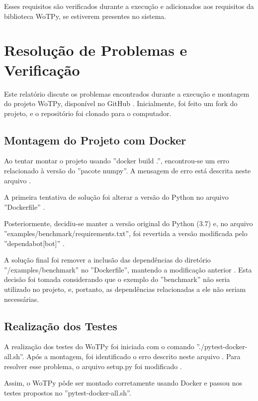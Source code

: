 Esses requisitos são verificados durante a execução e adicionados aos requisitos da biblioteca WoTPy, se estiverem presentes no sistema.

\section{Resolução de Problemas e Verificação}

Este relatório discute os problemas encontrados durante a execução e montagem do projeto WoTPy, disponível no GitHub \cite{gitwotpy:2022}. Inicialmente, foi feito um fork do projeto, e o repositório  foi clonado para o computador.

\subsection{Montagem do Projeto com Docker}

Ao tentar montar o projeto usando ''docker build .'', encontrou-se um erro relacionado à versão do ''pacote numpy''. A mensagem de erro está descrita neste arquivo \cite{gitwotpy:cpd}.

A primeira tentativa de solução foi alterar a versão do Python no arquivo ''Dockerfile'' \cite{gitwotpy:v1}.

Posteriormente, decidiu-se manter a versão original do Python (3.7) e, no arquivo ''examples/benchmark/requirements.txt'', foi revertida a versão modificada pelo ''dependabot[bot]'' \cite{gitwotpy:bot, gitwotpy:v2}.

A solução final foi remover a inclusão das dependências do diretório ''/examples/benchmark'' no ''Dockerfile'', mantendo a modificação anterior \cite{gitwotpy:v5}. Esta decisão foi tomada considerando que o exemplo do ''benchmark'' não seria utilizado no projeto, e, portanto, as dependências relacionadas a ele não seriam necessárias.

\subsection{Realização dos Testes}

A realização dos testes do WoTPy foi iniciada com o comando ''./pytest-docker-all.sh''. Após a montagem, foi identificado o erro descrito neste arquivo . Para resolver esse problema, o arquivo setup.py foi modificado \cite{gitwotpy:v1}.

Assim, o WoTPy pôde ser montado corretamente usando Docker e passou nos testes propostos no ''pytest-docker-all.sh''.

